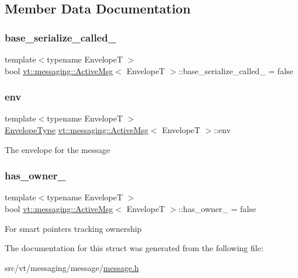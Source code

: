 \subsection{Member Data Documentation}
\mbox{\label{structvt_1_1messaging_1_1_active_msg_a853a59ae8106507e216809c828fdc7f2}} 
\subsubsection{\texorpdfstring{base\+\_\+serialize\+\_\+called\+\_\+}{base\_serialize\_called\_}}
{\footnotesize\ttfamily template$<$typename EnvelopeT $>$ \\
bool \hyperlink{structvt_1_1messaging_1_1_active_msg}{vt\+::messaging\+::\+Active\+Msg}$<$ EnvelopeT $>$\+::base\+\_\+serialize\+\_\+called\+\_\+ = false}

\mbox{\label{structvt_1_1messaging_1_1_active_msg_ae3f8937b2c95f548f1a3c3340b887c09}} 
\subsubsection{\texorpdfstring{env}{env}}
{\footnotesize\ttfamily template$<$typename EnvelopeT $>$ \\
\hyperlink{structvt_1_1messaging_1_1_active_msg_a6e2b0541c25f7290555bf50d7cc05874}{Envelope\+Type} \hyperlink{structvt_1_1messaging_1_1_active_msg}{vt\+::messaging\+::\+Active\+Msg}$<$ EnvelopeT $>$\+::env}

The envelope for the message \mbox{\label{structvt_1_1messaging_1_1_active_msg_a8cdaa2d7bbf2529831a6e7434132d385}} 
\subsubsection{\texorpdfstring{has\+\_\+owner\+\_\+}{has\_owner\_}}
{\footnotesize\ttfamily template$<$typename EnvelopeT $>$ \\
bool \hyperlink{structvt_1_1messaging_1_1_active_msg}{vt\+::messaging\+::\+Active\+Msg}$<$ EnvelopeT $>$\+::has\+\_\+owner\+\_\+ = false}

For smart pointers tracking ownership 

The documentation for this struct was generated from the following file\+:\begin{DoxyCompactItemize}
\item 
src/vt/messaging/message/\hyperlink{message_2message_8h}{message.\+h}\end{DoxyCompactItemize}
